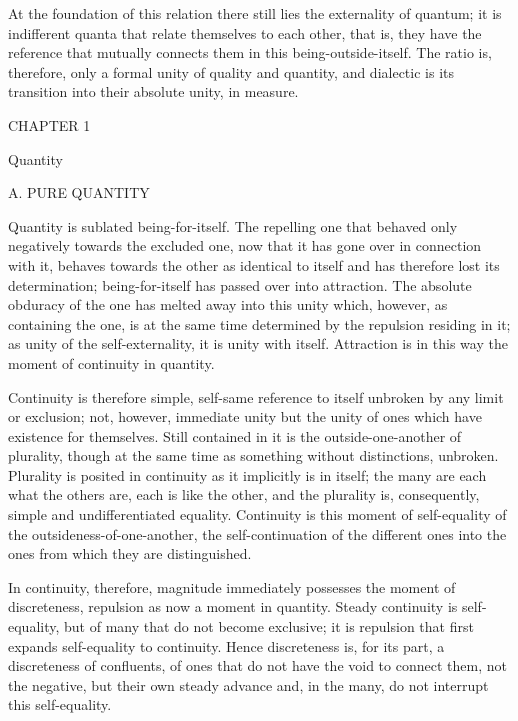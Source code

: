 At the foundation of this relation there still
lies the externality of quantum;
it is indifferent quanta that
relate themselves to each other,
that is, they have the reference
that mutually connects them
in this being-outside-itself.
The ratio is, therefore, only
a formal unity of quality and quantity,
and dialectic is its transition into
their absolute unity, in measure.

CHAPTER 1

Quantity

A. PURE QUANTITY

Quantity is sublated being-for-itself.
The repelling one that behaved only
negatively towards the excluded one,
now that it has gone over in connection with it,
behaves towards the other as identical to itself
and has therefore lost its determination;
being-for-itself has passed over into attraction.
The absolute obduracy of the one has melted away
into this unity which, however, as containing the one, is
at the same time determined by the repulsion residing in it;
as unity of the self-externality, it is unity with itself.
Attraction is in this way the moment of continuity in quantity.

Continuity is therefore simple, self-same reference to itself
unbroken by any limit or exclusion;
not, however, immediate unity but the unity of ones
which have existence for themselves.
Still contained in it is the outside-one-another of plurality,
though at the same time as something without distinctions, unbroken.
Plurality is posited in continuity as it implicitly is in itself;
the many are each what the others are,
each is like the other,
and the plurality is, consequently,
simple and undifferentiated equality.
Continuity is this moment of self-equality
of the outsideness-of-one-another,
the self-continuation of the different ones
into the ones from which they are distinguished.

In continuity, therefore, magnitude immediately possesses
the moment of discreteness, repulsion as now a moment in quantity.
Steady continuity is self-equality,
but of many that do not become exclusive;
it is repulsion that first expands self-equality to continuity.
Hence discreteness is, for its part, a discreteness of confluents,
of ones that do not have the void to connect them,
not the negative, but their own steady advance
and, in the many, do not interrupt this self-equality.

